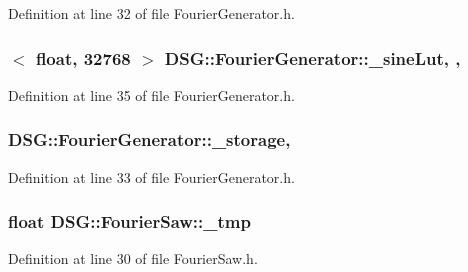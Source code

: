 Definition at line 32 of file Fourier\+Generator.\+h.

\hypertarget{classDSG_1_1FourierGenerator_a1ae5fb243ce05e638bdf0dec8bde7426}{
\subsubsection[{\+\_\+sine\+Lut}]{$<$ float, 32768 $>$ D\+S\+G\+::\+Fourier\+Generator\+::\+\_\+sine\+Lut\hspace{0.3cm}{\ttfamily [static]}, {\ttfamily [protected]}, {\ttfamily [inherited]}}}\label{classDSG_1_1FourierGenerator_a1ae5fb243ce05e638bdf0dec8bde7426}


Definition at line 35 of file Fourier\+Generator.\+h.

\hypertarget{classDSG_1_1FourierGenerator_a6b7f2439b26914cc9df6b6975a2cedac}{
\subsubsection[{\+\_\+storage}]{ D\+S\+G\+::\+Fourier\+Generator\+::\+\_\+storage\hspace{0.3cm}{\ttfamily [protected]}, {\ttfamily [inherited]}}}\label{classDSG_1_1FourierGenerator_a6b7f2439b26914cc9df6b6975a2cedac}


Definition at line 33 of file Fourier\+Generator.\+h.

\hypertarget{classDSG_1_1FourierSaw_afc22691229a12cd83726f09634d60d3b}{
\subsubsection[{\+\_\+tmp}]{\setlength{\rightskip}{0pt plus 5cm}float D\+S\+G\+::\+Fourier\+Saw\+::\+\_\+tmp\hspace{0.3cm}{\ttfamily [protected]}}}\label{classDSG_1_1FourierSaw_afc22691229a12cd83726f09634d60d3b}


Definition at line 30 of file Fourier\+Saw.\+h.

